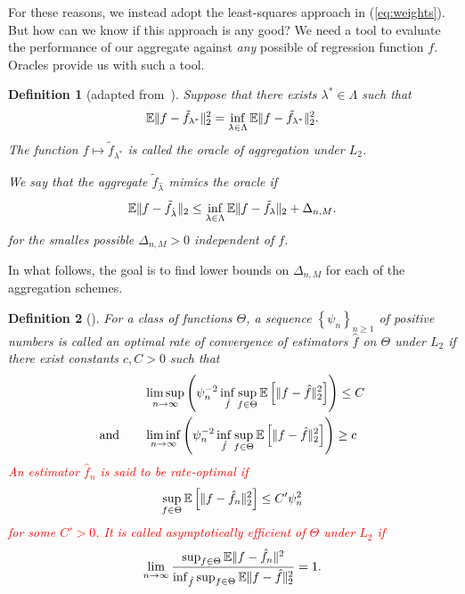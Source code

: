 \documentclass[11pt, letter paper]{article}
\newcommand{\1}{\mathmybb{1}}
\newtheorem{definition}{Definition}[section]
\newcommand{\0}{\emptyset}
\newcommand{\E}{\mathbb{E}}
\newcommand{\Ep}[1]{\mathbb{E}\left[ #1 \right]}
\newcommand{\paren}[1]{\left(#1 \right)}
\newcommand{\set}[1]{\left\{ #1 \right\}}
\newcommand{\norm}[1]{|\hspace{-1pt}|#1 |\hspace{-1pt}|}
\newcommand{\normsq}[1]{\norm{#1}^{2}}
\newcommand{\ftilde}[1]{\tilde{f}_{#1}}
\newcommand{\lambdahat}[1]{\hat{\lambda}_{#1}}
\begin{document}
For these reasons, we instead adopt the least-squares approach in (\ref{eq:weights}). But how can we know if this approach is any good? We need a tool to evaluate the performance of our aggregate against \emph{any} possible of regression function \(f\). Oracles provide us with such a tool. 

\begin{definition}[adapted from~\cite{tsybakov_introduction_2009}]
    Suppose that there exists \(\lambda^{*}\in\Lambda\) such that 
    \[\E\normsq{f-\ftilde{\lambda^{*}}}_{2} = \inf_{\lambda\in\Lambda}\E\normsq{f-\ftilde{\lambda^{*}}}_{2}.\]
    The function \(f\mapsto \ftilde{\lambda^{*}}\) is called the oracle of aggregation under \(L_{2}\).

    We say that the aggregate \(\ftilde{\lambdahat{}}\) {mimics} the oracle if
    \begin{equation}\label{eq:oracleineq}
        \E\norm{f - \ftilde{\lambdahat{}}}_{2} \leq \inf_{\lambda\in\Lambda}\E\norm{f - \ftilde{\lambda}}_{2} + \Delta_{n,M}.
    \end{equation}
    for the smalles possible \(\Delta_{n,M}>0\) independent of \(f\).
\end{definition}

In what follows, the goal is to find lower bounds on \(\Delta_{n,M}\) for each of the aggregation schemes. 

\begin{definition}[\cite{tsybakov_introduction_2009}]
    For a class of functions \(\Theta\), a sequence \(\set{\psi_{n}}_{n\geq1}\) of positive numbers is called an \emph{optimal rate of convergence} of estimators \(\hat{f}\) on \(\Theta\) under \(L_{2}\) if there exist constants \(c, C>0\) such that
    \begin{align}
        &\limsup_{n\to\infty}\paren{\psi_{n}^{-2}\inf_{\hat{f}}\sup_{f\in\Theta}\Ep{\norm{f - \hat{f}}_{2}^{2}}}\leq C\\
        \text{and}\qquad&\liminf_{n\to\infty}\paren{\psi_{n}^{-2}\inf_{\hat{f}}\sup_{f\in\Theta}\Ep{\norm{f - \hat{f}}_{2}^{2}}}\geq c
    \end{align}
    \textcolor{red}{An estimator \(\hat{f}_{n}\) is said to be \emph{rate-optimal} if 
    \[\sup_{f\in\Theta}\Ep{\norm{f - \hat{f}_{n}}_{2}^{2}} \leq C'\psi_{n}^{2}\]
    for some \(C'>0\). It is called \emph{asymptotically efficient} of \(\Theta\) under \(L_{2}\) if 
    \[\lim_{n\to\infty}\frac{\sup_{f\in\Theta}\E{\normsq{f-\hat{f}_{n}}}}{\inf_{\hat{f}}\sup_{f\in\Theta}\E{\norm{f - \hat{f}}_{2}^{2}}}=1.\]}
\end{definition}
\end{document}
